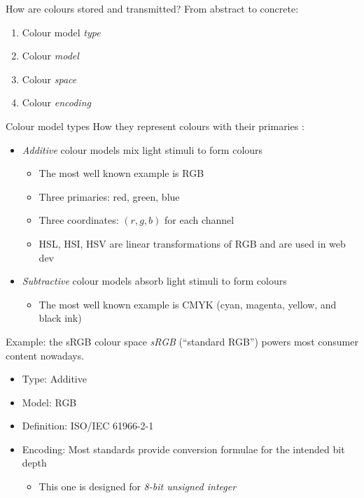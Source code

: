 \documentclass[aspectratio=169,handout,usepdftitle=false]{fireshonks}
\begin{document}
\begin{frame}{How are colours stored and transmitted?}
    From abstract to concrete:
    \begin{enumerate}
        \item Colour model \emph{type}
        \item Colour \emph{model}
        \item Colour \emph{space}
        \item Colour \emph{encoding}
    \end{enumerate}
\end{frame}
\begin{frame}{Colour model types}
    How they represent colours with their primaries \autocite{allen23}:
    \begin{itemize}
        \item \emph{Additive} colour models mix light stimuli to form colours
              \begin{itemize}
                  \item The most well known example is RGB
                  \item Three primaries: red, green, blue
                  \item Three coordinates: $(r, g, b)$ for each channel
                  \item HSL, HSI, HSV are linear transformations of RGB and are used in web dev
              \end{itemize}
        \item \emph{Subtractive} colour models absorb light stimuli to form colours
              \begin{itemize}
                  \item The most well known example is CMYK (cyan, magenta, yellow, and black ink)
              \end{itemize}
    \end{itemize}
\end{frame}
\begin{frame}{Example: the sRGB colour space}
    \emph{sRGB} (\enquote{standard RGB}) powers most consumer content nowadays.
    \begin{itemize}
        \item Type: Additive
        \item Model: RGB
        \item Definition: ISO/IEC 61966-2-1 \parencite*{srgb2002}
        \item Encoding: Most standards provide conversion formulae for the intended bit depth
              \begin{itemize}
                  \item This one is designed for \emph{8-bit unsigned integer}
              \end{itemize}
    \end{itemize}
\end{frame}
\end{document}
